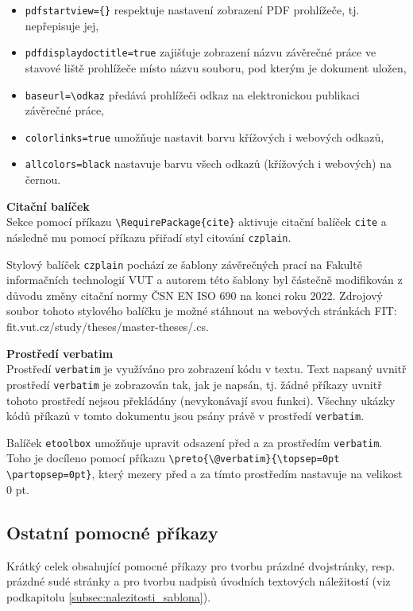 \begin{itemize}[label=-]
	\item \verb|pdfstartview={}| respektuje nastavení zobrazení PDF prohlížeče, tj. nepřepisuje jej,
	\item \verb|pdfdisplaydoctitle=true| zajišťuje zobrazení názvu závěrečné práce ve stavové liště prohlížeče místo názvu souboru, pod kterým je dokument uložen,
	\item \verb|baseurl=\odkaz| předává prohlížeči odkaz na elektronickou publikaci závěrečné práce,
	\item \verb|colorlinks=true| umožňuje nastavit barvu křížových i webových odkazů,
	\item \verb|allcolors=black| nastavuje barvu všech odkazů (křížových i webových) na černou.
\end{itemize}

\vspace{8pt}

\textbf{Citační balíček}\\
Sekce pomocí příkazu \verb|\RequirePackage{cite}| aktivuje citační balíček \verb|cite| a následně mu pomocí příkazu \verb|| přiřadí styl citování \verb|czplain|. 

Stylový balíček \verb|czplain| pochází ze šablony závěrečných prací na Fakultě informačních technologií VUT a autorem této šablony byl částečně modifikován z důvodu změny citační normy ČSN EN ISO 690 na konci roku 2022. Zdrojový soubor tohoto stylového balíčku je možné stáhnout na webových stránkách FIT: fit.vut.cz/study/theses/master-theses/.cs.

\vspace{8pt}

\textbf{Prostředí verbatim}\\
Prostředí \verb|verbatim| je využíváno pro zobrazení kódu v textu. Text napsaný uvnitř prostředí \verb|verbatim| je zobrazován tak, jak je napsán, tj. žádné příkazy uvnitř tohoto prostředí nejsou překládány (nevykonávají svou funkci). Všechny ukázky kódů příkazů v tomto dokumentu jsou psány právě v prostředí \verb|verbatim|.

Balíček \verb|etoolbox| umožňuje upravit odsazení před a za prostředím \verb|verbatim|. Toho je docíleno pomocí příkazu \verb|\preto{\@verbatim}{\topsep=0pt \partopsep=0pt}|, který mezery před a za tímto prostředím nastavuje na velikost 0 pt.




\subsection{Ostatní pomocné příkazy}
Krátký celek obsahující pomocné příkazy pro tvorbu prázdné dvojstránky, resp. prázdné sudé stránky a pro tvorbu nadpisů úvodních textových náležitostí (viz podkapitolu \ref{subsec:nalezitosti_sablona}).

